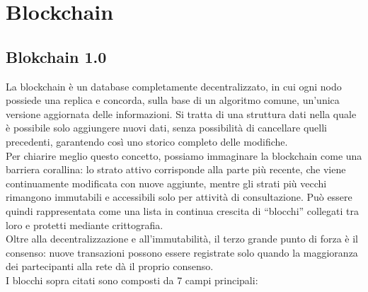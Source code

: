 \chapter{Blockchain}
\section{Blokchain 1.0}
La blockchain è un database completamente decentralizzato, in cui ogni nodo possiede una replica e concorda, sulla base di un algoritmo comune, un’unica versione aggiornata delle informazioni. Si tratta di una struttura dati nella quale è possibile solo aggiungere nuovi dati, senza possibilità di cancellare quelli precedenti, garantendo così uno storico completo delle modifiche.
\\Per chiarire meglio questo concetto, possiamo immaginare la blockchain come una barriera corallina: lo strato attivo corrisponde alla parte più recente, che viene continuamente modificata con nuove aggiunte, mentre gli strati più vecchi rimangono immutabili e accessibili solo per attività di consultazione.
Può essere quindi rappresentata come una lista in continua crescita di “blocchi” collegati tra loro e protetti mediante crittografia. 
\\Oltre alla decentralizzazione e all’immutabilità, il terzo grande punto di forza è il consenso: nuove transazioni possono essere registrate solo quando la maggioranza dei partecipanti alla rete dà il proprio consenso.
\\I blocchi sopra citati sono composti da 7 campi principali: 
